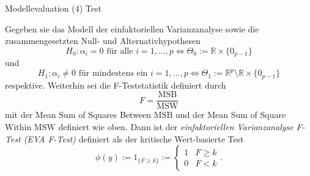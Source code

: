 \documentclass[
  8pt,
  ignorenonframetext,
]{beamer}
\begin{document}
\begin{frame}{Modellevaluation}
\protect\hypertarget{modellevaluation-14}{}
\noindent (4) Test

\footnotesize
\begin{definition}
\justifying
Gegeben sie das Modell der einfaktoriellen Varianzanalyse sowie die zusammengesetzten
Null- und Alternativhypothesen
\begin{equation}
H_0 : \alpha_i = 0 \mbox{ für alle } i = 1,...,p \Leftrightarrow \Theta_0 := \mathbb{R} \times \{0_{p-1}\}
\end{equation}
und
\begin{equation}
H_1 : \alpha_i \neq 0 \mbox{ für mindestens ein } i = 1,...,p \Leftrightarrow \Theta_1 := \mathbb{R}^p \setminus \mathbb{R} \times \{0_{p-1}\}
\end{equation}
respektive. Weiterhin sei die F-Teststatistik definiert durch
\begin{equation}
F = \frac{\mbox{MSB}}{\mbox{MSW}}
\end{equation}
mit der Mean Sum of Squares Between $\mbox{MSB}$ und der Mean Sum of Square Within
$\mbox{MSW}$ definiert wie oben. Dann ist der \textit{einfaktoriellen Varianzanalyse F-Test (EVA F-Test)} 
definiert als der kritische Wert-basierte Test
\begin{equation}
\phi(y) := 1_{\{F \ge k\}} :=
\begin{cases}
1 & F \ge k \\
0 & F < k
\end{cases}.
\end{equation}
\end{definition}
\end{frame}
\end{document}
